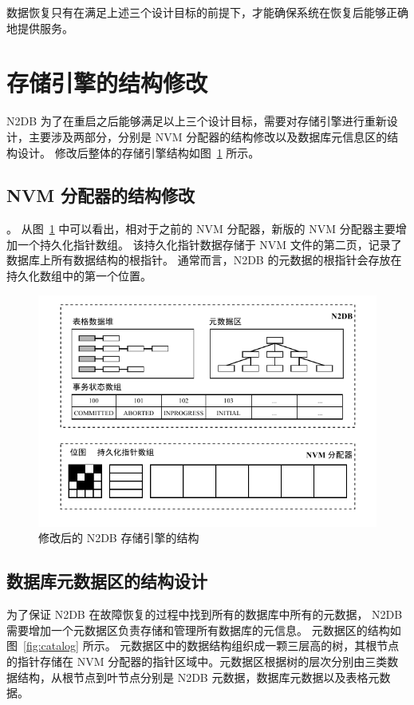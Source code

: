 数据恢复只有在满足上述三个设计目标的前提下，才能确保系统在恢复后能够正确地提供服务。

\section{存储引擎的结构修改}

N2DB 为了在重启之后能够满足以上三个设计目标，需要对存储引擎进行重新设计，主要涉及两部分，分别是 NVM 分配器的结构修改以及数据库元信息区的结构设计。
修改后整体的存储引擎结构如图~\ref{fig:nvm-allocator} 所示。

\subsection{NVM 分配器的结构修改}。
从图~\ref{fig:nvm-allocator} 中可以看出，相对于之前的 NVM 分配器，新版的 NVM 分配器主要增加一个持久化指针数组。
该持久化指针数据存储于 NVM 文件的第二页，记录了数据库上所有数据结构的根指针。
通常而言，N2DB 的元数据的根指针会存放在持久化数组中的第一个位置。

\begin{figure}[ht]
    \centering
    \includegraphics[width=1\linewidth]{figures/new-nvm-allocator}
    \caption{修改后的 N2DB 存储引擎的结构}
    \label{fig:nvm-allocator}
\end{figure}

\subsection{数据库元数据区的结构设计}

为了保证 N2DB 在故障恢复的过程中找到所有的数据库中所有的元数据， N2DB 需要增加一个元数据区负责存储和管理所有数据库的元信息。
元数据区的结构如图~\ref{fig:catalog} 所示。
元数据区中的数据结构组织成一颗三层高的树，其根节点的指针存储在 NVM 分配器的指针区域中。元数据区根据树的层次分别由三类数据结构，从根节点到叶节点分别是 N2DB 元数据，数据库元数据以及表格元数据。


